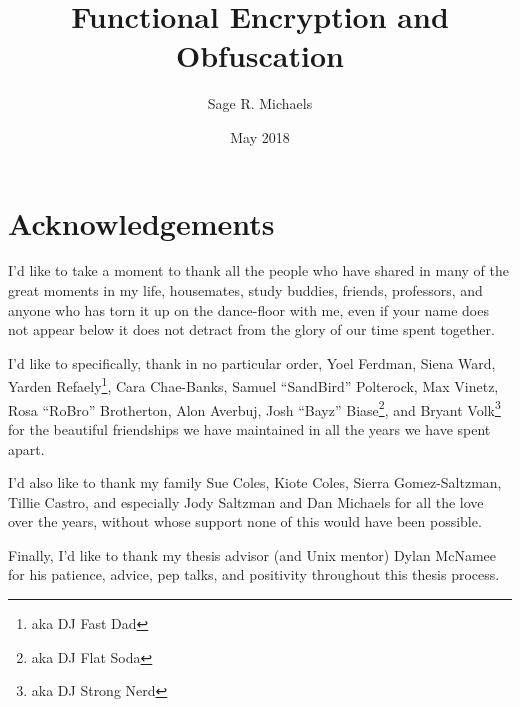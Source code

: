 \documentclass[12pt,twoside]{reedthesis}
\title{Functional Encryption and Obfuscation}
\author{Sage R. Michaels}
\date{May 2018}
\begin{document}
  \maketitle
  \frontmatter %
  \pagestyle{empty} %

    \chapter*{Acknowledgements}
	
		
	I'd like to take a moment to thank all the people who have shared in many of the great moments in my life, housemates, study buddies, friends, professors, and anyone who has torn it up on the dance-floor with me, even if your name does not appear below it does not detract from the glory of our time spent together. 
	\par I'd like to specifically, thank in no particular order, Yoel Ferdman,  Siena Ward, Yarden Refaely\footnote{aka DJ Fast Dad}, Cara Chae-Banks, Samuel ``SandBird'' Polterock, Max Vinetz, Rosa ``RoBro'' Brotherton, Alon Averbuj, Josh ``Bayz'' Biase\footnote{aka DJ Flat Soda}, and Bryant Volk\footnote{aka DJ Strong Nerd} for the beautiful friendships we have maintained in all the years we have spent apart.  	
	\par I'd also like to thank my family Sue Coles, Kiote Coles, Sierra Gomez-Saltzman, Tillie Castro, and especially Jody Saltzman and Dan Michaels for all the love over the years, without whose support none of this would have been possible.
	\par Finally, I'd like to thank my thesis advisor (and Unix mentor) Dylan McNamee for his patience, advice, pep talks, and positivity throughout this thesis process. 


\end{document}
